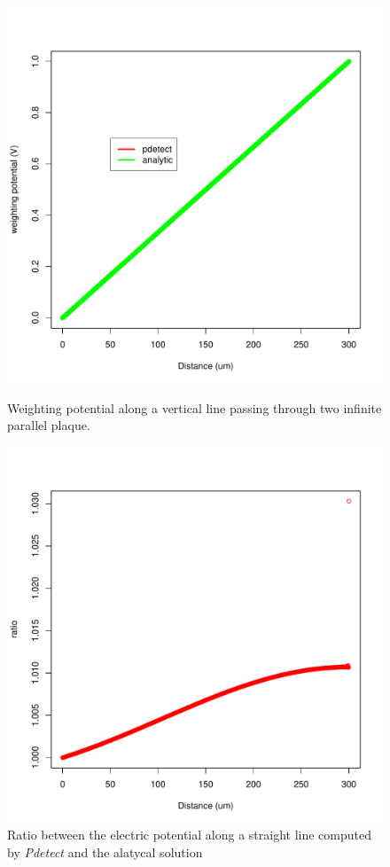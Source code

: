 \documentclass[11pt]{article}
\begin{document}
			\begin{figure}[H]
				\begin{minipage}[b]{.46\linewidth}
					\center
					\includegraphics[scale=0.45]{images/boundary_conditions/parallel.pdf}
					\caption{Weighting potential along a vertical line passing through two infinite parallel plaque.}
					\label{fig:parallel}
				\end{minipage} \hfill
				\begin{minipage}[b]{.46\linewidth}
					\center
					\includegraphics[scale=0.45]{images/boundary_conditions/parallel_ratio.pdf}
					\caption{Ratio between the electric potential along a straight line 
							computed by \textit{Pdetect} and the alatycal solution}
					\label{fig:parallel_ratio}
				\end{minipage}
			\end{figure}
\end{document}
